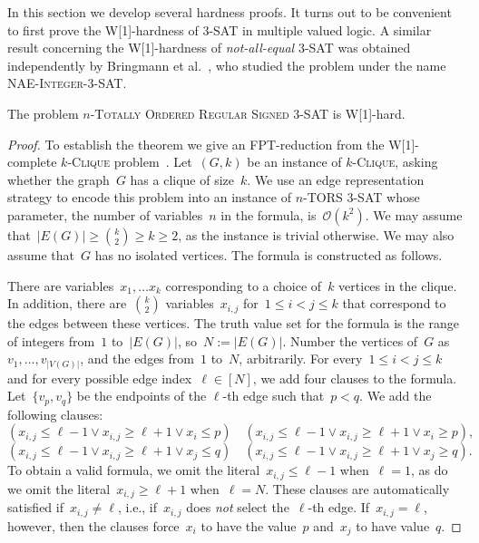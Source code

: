 \let\accentvec\vec  \documentclass{llncs}
\newcommand{\Oh}{{\mathcal{O}}}
\newcommand{\SignedThreeSatn}{\textsc{$n$-Totally Ordered Regular Signed 3-SAT}\xspace}
\newcommand{\nTORSThreeSat}{\textsc{$n$-TORS 3-SAT}\xspace}
\newcommand{\kClique}{\textsc{$k$-Clique}\xspace}
\begin{document}
In this section we develop several hardness proofs. It turns out to be convenient to first prove the W[1]-hardness of 3-SAT in multiple valued logic. A similar result concerning the W[1]-hardness of \emph{not-all-equal} 3-SAT was obtained independently by Bringmann et al.~\cite{BringmannHML15}, who studied the problem under the name \textsc{NAE-Integer-$3$-SAT}.

\begin{theorem} \label{thm:threesat:whard}
The problem \SignedThreeSatn is W[1]-hard.
\end{theorem}
\begin{proof}
To establish the theorem we give an FPT-reduction from the W[1]-complete \kClique problem~\cite[Chapter 21]{DowneyF13}. Let~$(G,k)$ be an instance of \kClique, asking whether the graph~$G$ has a clique of size~$k$. We use an edge representation strategy to encode this problem into an instance of \nTORSThreeSat whose parameter, the number of variables~$n$ in the formula, is~$\Oh(k^2)$. We may assume that~$|E(G)| \geq \binom{k}{2} \geq k \geq 2$, as the instance is trivial otherwise. We may also assume that~$G$ has no isolated vertices. The formula is constructed as follows.

There are variables~$x_1, \ldots x_k$ corresponding to a choice of~$k$ vertices in the clique. In addition, there are~$\binom{k}{2}$ variables~$x_{i,j}$ for~$1 \leq i < j \leq k$ that correspond to the edges between these vertices. The truth value set for the formula is the range of integers from~$1$ to~$|E(G)|$, so~$N := |E(G)|$. Number the vertices of~$G$ as~$v_1, \ldots, v_{|V(G)|}$, and the edges from~$1$ to~$N$, arbitrarily. For every~$1 \leq i < j \leq k$ and for every possible edge index~$\ell \in [N]$, we add four clauses to the formula. Let~$\{v_p,v_q\}$ be the endpoints of the $\ell$-th edge such that~$p < q$. We add the following clauses:
	$$(x_{i,j} \leq \ell-1 \vee x_{i,j} \geq \ell+1 \vee x_i \leq p) \quad (x_{i,j} \leq \ell-1 \vee x_{i,j} \geq \ell+1 \vee x_i \geq p),$$
	$$(x_{i,j} \leq \ell-1 \vee x_{i,j} \geq \ell+1 \vee x_j \leq q) \quad (x_{i,j} \leq \ell-1 \vee x_{i,j} \geq \ell+1 \vee x_j \geq q).$$
	To obtain a valid formula, we omit the literal~$x_{i,j} \leq \ell - 1$ when~$\ell=1$, as do we omit the literal~$x_{i,j} \geq \ell + 1$ when~$\ell = N$. These clauses are automatically satisfied if~$x_{i,j} \neq \ell$, i.e., if~$x_{i,j}$ does \emph{not} select the~$\ell$-th edge. If~$x_{i,j} = \ell$, however, then the clauses force~$x_i$ to have the value~$p$ and~$x_j$ to have value~$q$.
	

\end{proof}
\end{document}
